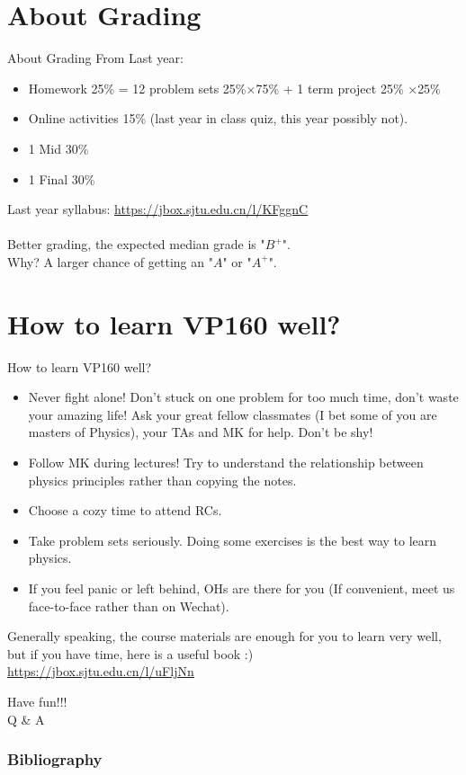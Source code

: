 \documentclass{beamer}
\begin{document}
\section{About Grading}
\begin{frame}{About Grading}
  From Last year:
  \begin{itemize}
    \item Homework 25\% =  12 problem sets 25\%$\times $75\% + 1 term project 25\% $\times $25\%
    \item Online activities 15\% (last year in class quiz, this year possibly not).
    \item 1 Mid 30\%
    \item 1 Final 30\%
  \end{itemize}
    Last year syllabus: \underline{\small{\url{https://jbox.sjtu.edu.cn/l/KFggnC}}}\\
    ~\\
    Better grading, the expected median grade is "$B^+$".\\
    Why? A larger chance of getting an "$A$" or "$A^+$".
    \end{frame}

\section{How to learn VP160 well?}
\begin{frame}{How to learn VP160 well?}
    \begin{itemize}
      \item Never fight alone! Don't stuck on one problem for too much time, don't waste your amazing life! Ask your great fellow classmates (I bet some of you are masters of Physics), your TAs and MK for help. Don't be shy!
      \item Follow MK during lectures! Try to understand the relationship between physics principles rather than copying the notes.
      \item Choose a cozy time to attend RCs.
      \item Take problem sets seriously. Doing some exercises is the best way to learn physics.
      \item If you feel panic or left behind, OHs are there for you (If convenient, meet us face-to-face rather than on Wechat).
    \end{itemize}
\end{frame}

\begin{frame}
  Generally speaking, the course materials are enough for you to learn very well, but if you have time, here is a useful book :)\\
  \underline{\small{\url{https://jbox.sjtu.edu.cn/l/uFljNn}}}
\end{frame}
\begin{frame}
  \centering
  \huge{Have fun!!!}\\
  \huge{Q \& A}
\end{frame}
\renewcommand{\bibfont}{\footnotesize}
\frametitle{Bibliography}




\end{document}
